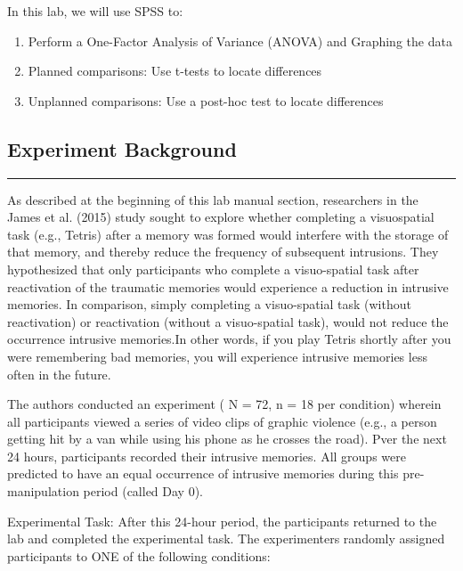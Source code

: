 \documentclass[]{book}
\providecommand{\tightlist}{%
  \setlength{\itemsep}{0pt}\setlength{\parskip}{0pt}}
\begin{document}
In this lab, we will use SPSS to:

\begin{enumerate}
\def\labelenumi{\arabic{enumi}.}
\tightlist
\item
  Perform a One-Factor Analysis of Variance (ANOVA) and Graphing the
  data
\item
  Planned comparisons: Use t-tests to locate differences
\item
  Unplanned comparisons: Use a post-hoc test to locate differences
\end{enumerate}

\subsection{Experiment Background}\label{experiment-background-3}

\begin{center}\rule{0.5\linewidth}{0.5pt}\end{center}

As described at the beginning of this lab manual section, researchers in
the James et al. (2015) study sought to explore whether completing a
visuospatial task (e.g., Tetris) after a memory was formed would
interfere with the storage of that memory, and thereby reduce the
frequency of subsequent intrusions. They hypothesized that only
participants who complete a visuo-spatial task after reactivation of the
traumatic memories would experience a reduction in intrusive memories.
In comparison, simply completing a visuo-spatial task (without
reactivation) or reactivation (without a visuo-spatial task), would not
reduce the occurrence intrusive memories.In other words, if you play
Tetris shortly after you were remembering bad memories, you will
experience intrusive memories less often in the future.

The authors conducted an experiment ( N = 72, n = 18 per condition)
wherein all participants viewed a series of video clips of graphic
violence (e.g., a person getting hit by a van while using his phone as
he crosses the road). Pver the next 24 hours, participants recorded
their intrusive memories. All groups were predicted to have an equal
occurrence of intrusive memories during this pre-manipulation period
(called Day 0).

Experimental Task: After this 24-hour period, the participants returned
to the lab and completed the experimental task. The experimenters
randomly assigned participants to ONE of the following conditions:
\end{document}

